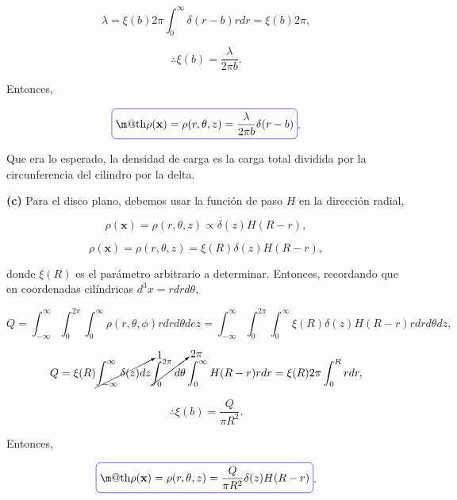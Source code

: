\documentclass[a4paper,10pt]{article}
\makeatletter
\numberwithin{equation}{section}
\newcommand*{\boxcolor}{blue}
\renewcommand{\boxed}[1]{\textcolor{\boxcolor}{%
\tikz[baseline={([yshift=-1ex]current bounding box.center)}] \node [rectangle, minimum width=1ex,rounded corners,draw] {\normalcolor\m@th$\displaystyle#1$};}}
\makeatother
\begin{document}
\begin{equation}
 \lambda = \xi(b)2\pi \int_0^\infty \delta(r-b)rdr = \xi(b)2\pi,
\end{equation}

\begin{equation}
 \therefore \xi(b) = \frac{\lambda}{2\pi b}.
\end{equation}

Entonces, 

\begin{equation}
 \boxed{\rho(\mathbf{x}) =  \rho(r,\theta,z) = \frac{\lambda}{2\pi b}\delta(r - b)}.
\end{equation}

Que era lo esperado, la densidad de carga es la carga total dividida por la circunferencia 
del cilindro por la delta.

\textbf{(c)} Para el disco plano, debemos usar la función de paso $H$ en la dirección 
radial, 

\begin{equation}
 \rho(\mathbf{x}) =  \rho(r,\theta,z) \propto \delta(z)H(R-r),
\end{equation}

\begin{equation}
 \rho(\mathbf{x}) =  \rho(r,\theta,z) = \xi(R) \delta(z)H(R-r),
\end{equation}

donde $\xi(R)$ es el parámetro arbitrario a determinar. Entonces, recordando que 
en coordenadas cilíndricas $d^3x = rdr d\theta$, 

\begin{equation*}
 Q = \int_{-\infty}^{\infty}\int_0^{2\pi} \int_0^\infty 
  \rho(r,\theta,\phi) rdr d\theta dez = 
  \int_{-\infty}^{\infty} \int_0^{2\pi} \int_0^\infty \xi(R) \delta(z)H(R-r)
  r drd\theta dz,
\end{equation*}

\begin{equation}
 Q = \xi(R) \cancelto{1}{\int_{-\infty}^{\infty} \delta(z)dz} 
 \cancelto{2\pi}{\int_0^{2\pi} d\theta}
 \int_0^\infty H(R-r) r dr = \xi(R) 2\pi \int_0^R rdr,
\end{equation}

\begin{equation}
 \therefore \xi(b) = \frac{Q}{\pi R^2}.
\end{equation}

Entonces, 

\begin{equation}
 \boxed{\rho(\mathbf{x}) =  \rho(r,\theta,z) = \frac{Q}{\pi R^2}\delta(z)H(R-r)}.
\end{equation}
\end{document}

